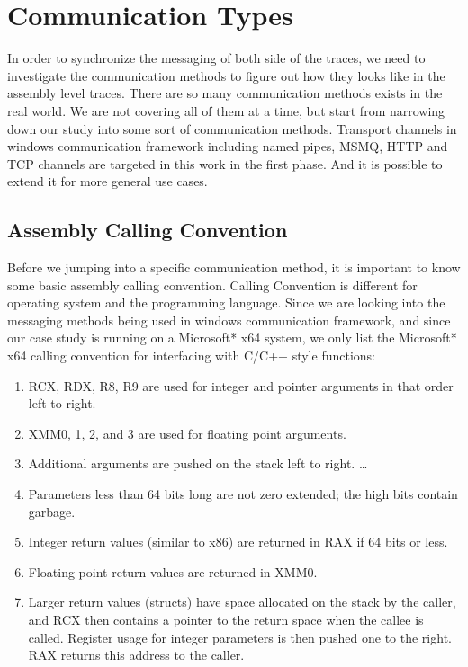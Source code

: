 \documentclass[paper=a4, fontsize=11pt]{scrartcl}
\numberwithin{equation}{section}		%
\numberwithin{figure}{section}			%
\numberwithin{table}{section}				%
\begin{document}
\section{Communication Types}
In order to synchronize the messaging of both side of the traces, we need to investigate the communication methods to figure out how they looks like in the assembly level traces.
There are so many communication methods exists in the real world. We are not covering all of them at a time, but start from narrowing down our study into some sort of communication methods. Transport channels in windows communication framework including named pipes, MSMQ, HTTP and TCP channels are targeted in this work in the first phase. And it is possible to extend it for more general use cases.
\subsection{Assembly Calling Convention}
Before we jumping into a specific communication method, it is important to know some basic assembly calling convention.
Calling Convention is different for operating system and the programming language. Since we are looking into the messaging methods being used in windows communication framework, and since our case study is running on a Microsoft* x64 system, we only list the Microsoft* x64 calling convention for interfacing with C/C++ style functions:\par
\begin{enumerate}  
\item RCX, RDX, R8, R9 are used for integer and pointer arguments in that order left to right.
\item XMM0, 1, 2, and 3 are used for floating point arguments.
\item Additional arguments are pushed on the stack left to right. \ldots 
\item Parameters less than 64 bits long are not zero extended; the high bits contain garbage.
\item Integer return values (similar to x86) are returned in RAX if 64 bits or less.
\item Floating point return values are returned in XMM0.
\item Larger return values (structs) have space allocated on the stack by the caller, and RCX then contains a pointer to the return space when the callee is called. Register usage for integer parameters is then pushed one to the right. RAX returns this address to the caller.
\end{enumerate}
\end{document}
